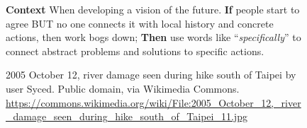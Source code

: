 \documentclass{article}
\begin{document}
\begin{figure}[h]
\begin{adjustbox}{minipage=[c]{\textwidth-10mm},margin= 5mm 15mm 5mm 13mm, frame=1pt, bgcolor=almond,env=center}
\begin{center}
\begin{minipage}[t]{0.7\paperwidth}
\Large\raggedright
\textbf{Context} When developing a vision of the future.\newline
\textbf{If} people start to agree BUT no one connects it with local history and concrete actions, then work bogs down;\newline
\textbf{Then} use words like “\emph{specifically}” to connect abstract problems and solutions to specific actions.
\end{minipage}
\end{center}
\caption*{2005 October 12, river damage seen during hike south of Taipei  by user Syced. Public domain, via Wikimedia Commons.\newline
\url{https://commons.wikimedia.org/wiki/File:2005_October_12,_river_damage_seen_during_hike_south_of_Taipei_11.jpg}}
\end{adjustbox}
\end{figure}
\end{document}

